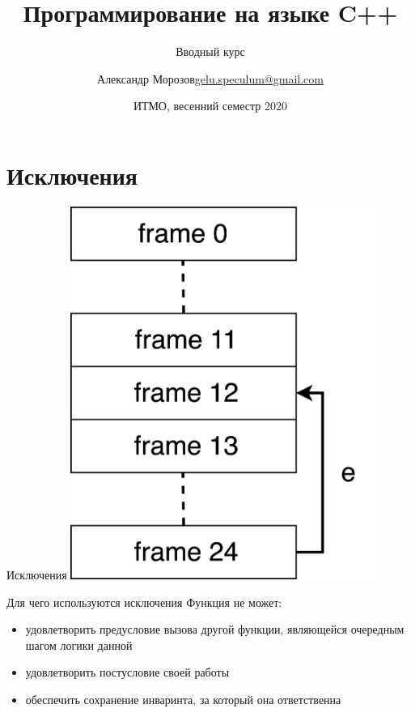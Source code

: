 \documentclass[unknownkeysallowed,xcolor=table]{beamer}
\title[C++]
{Программирование на языке C++}
\subtitle{Вводный курс}
\author[А.~Б.~Морозов]
{
  \texorpdfstring{Александр Морозов\newline\href{mailto:gelu.speculum@gmail.com}{gelu.speculum@gmail.com}}
  {Александр Морозов}
}
\date[ITMO 2020]
{ИТМО, весенний семестр 2020}
\begin{document}
\frame{\titlepage}


\section{Исключения}

\begin{frame}{Исключения}
    \includegraphics[align=c,width=10cm,keepaspectratio]{images/exception.png}
\end{frame}

\begin{frame}{Для чего используются исключения}
  Функция не может:
  \begin{itemize}
    \item удовлетворить предусловие вызова другой функции, являющейся очередным шагом логики данной \vspace{1em}
    \item удовлетворить постусловие своей работы \vspace{1em}
    \item обеспечить сохранение инваринта, за который она ответственна
  \end{itemize}
\end{frame}
\end{document}
